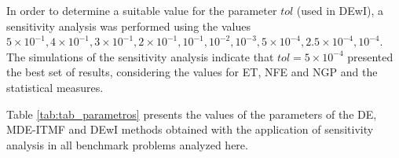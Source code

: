 \documentclass[smallextended]{svjour3}       %
\begin{document}
In order to determine a suitable value for the parameter $tol$ (used in DEwI), a sensitivity analysis was performed using the values $5 \times 10^{-1}, 4 \times 10^{-1}, 3 \times 10^{-1}, 2 \times 10^{-1},  10^{-1}, 10^{-2}, 10^{-3}, 5 \times 10^{-4}, 2.5 \times 10^{-4}, 10^{-4}$. The simulations of the sensitivity analysis indicate that $tol = 5 \times 10^{-4}$ presented the best set of results, considering the values for ET, NFE and NGP and the statistical measures.

Table \ref{tab:tab_parametros} presents the values of the parameters of the DE, MDE-ITMF and DEwI methods obtained with the application of sensitivity analysis in all benchmark problems analyzed here.

\begin{table}[!htp]
\centering{}
\caption{Control parameters for ED, MDE-ITMF and DEwI methods}
\end{table}
\end{document}
